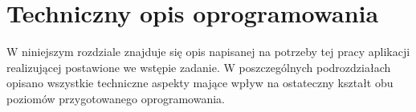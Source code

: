 \chapter{Techniczny opis oprogramowania}
\label{cha:software}

W niniejszym rozdziale znajduje się opis napisanej na potrzeby tej pracy aplikacji realizującej postawione we wstępie zadanie. W poszczególnych podrozdziałach opisano wszystkie techniczne aspekty mające wpływ na ostateczny kształt obu poziomów przygotowanego oprogramowania.




